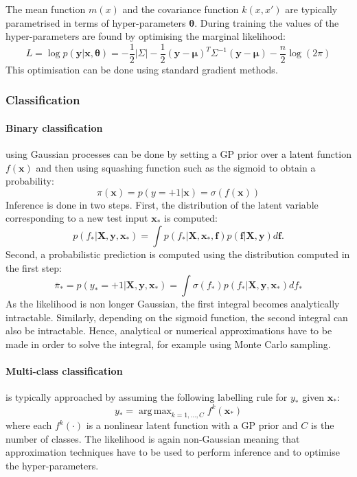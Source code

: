 \documentclass{article}
\DeclareMathOperator*{\argmax}{arg\,max} %
\begin{document}
The mean function $m(x)$ and the covariance function $k(x,x')$ are typically parametrised in terms of hyper-parameters $\bm{\theta}$. During training the values of the hyper-parameters are found by optimising the marginal likelihood:
\begin{equation*}
	L = \log p(\mathbf{y}\vert\mathbf{x},\bm{\theta}) = -\frac{1}{2}\vert\Sigma\vert - \frac{1}{2}(\mathbf{y}-\bm{\mu})^T\Sigma^{-1}(\mathbf{y}-\bm{\mu}) - \frac{n}{2}\log(2\pi)
\end{equation*}
This optimisation can be done using standard gradient methods.
\subsubsection{Classification}
\paragraph{Binary classification} using Gaussian processes can be done by setting a GP prior over a latent function $f(\mathbf{x})$ and then using squashing function such as the sigmoid to obtain a probability:
\begin{equation*}
	\pi(\mathbf{x}) = p(y = +1 \vert \mathbf{x}) = \sigma(f(\mathbf{x}))
\end{equation*}
Inference is done in two steps. First, the distribution of the latent variable corresponding to a new test input $\mathbf{x}_*$ is computed:
\begin{equation*}
	p(f_*  \vert \mathbf{X}, \mathbf{y}, \mathbf{x}_*) = \int p (f_*  \vert \mathbf{X}, \mathbf{x}_*, \mathbf{f}) p(\mathbf{f} \vert \mathbf{X}, \mathbf{y}) d\mathbf{f}.
\end{equation*}
Second, a probabilistic prediction is computed using the distribution computed in the first step:
\begin{equation*}
	\bar{\pi}_* = p(y_* = +1 |\mathbf{X}, \mathbf{y}, \mathbf{x}_*) = \int \sigma(f_*) p(f_*  \vert \mathbf{X}, \mathbf{y}, \mathbf{x}_*) df_*
\end{equation*}
As the likelihood is non longer Gaussian, the first integral becomes analytically intractable. Similarly, depending on the sigmoid function, the second integral can also be intractable. Hence, analytical or numerical approximations have to be made in order to solve the integral, for example using Monte Carlo sampling.

\paragraph{Multi-class classification} is typically \cite{villacampa2017scalable} approached by assuming the following labelling rule for $y_*$ given $\mathbf{x}_*$:
\begin{equation*}
	y_* = \argmax_{k=1,\dots,C} f^k(\mathbf{x}_*)
\end{equation*} 
where each $f^k(\cdot)$ is a nonlinear latent function with a GP prior and $C$ is the number of classes. The likelihood is again non-Gaussian meaning that approximation techniques have to be used to perform inference and to optimise the hyper-parameters.
\end{document}
